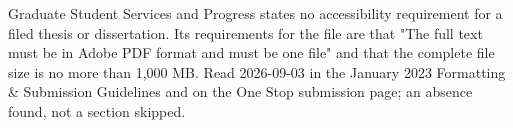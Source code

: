 
%

%

%
%
	{Graduate Student Services and Progress states no accessibility requirement
	 for a filed thesis or dissertation. Its requirements for the file are that
	 "The full text must be in Adobe PDF format and must be one file" and that
	 the complete file size is no more than 1,000 MB. Read 2026-09-03 in the
	 January 2023 Formatting \& Submission Guidelines and on the One Stop
	 submission page; an absence found, not a section skipped.}

